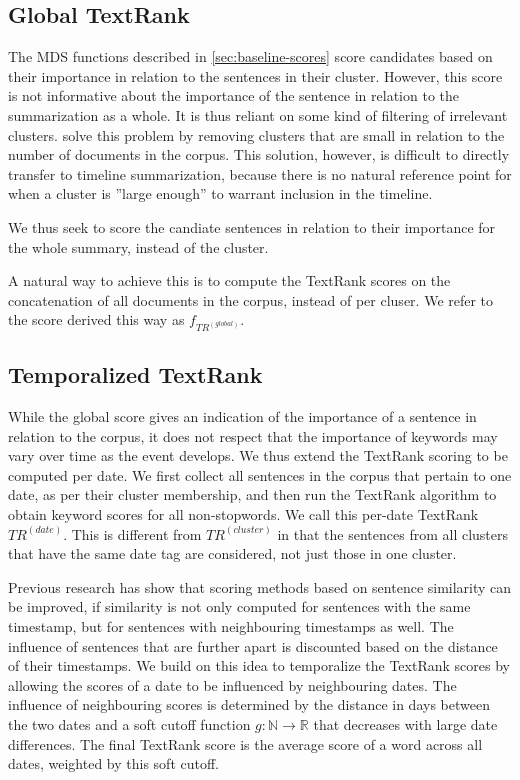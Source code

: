 \documentclass[a4paper,BCOR=10mm]{report}
\numberwithin{lemma}{chapter}
\numberwithin{definition}{chapter}
\begin{document}
\subsection{Global TextRank}

The MDS functions described in \ref{sec:baseline-scores} score candidates based on their importance in relation to the sentences in their cluster.
However, this score is not informative about the importance of the sentence in relation to the summarization as a whole.
It is thus reliant on some kind of filtering of irrelevant clusters. \citet{banerjee} solve this problem by removing clusters that are small in relation to the number of documents in the corpus. This solution, however, is difficult to directly transfer to timeline summarization, because there is no natural reference point for when a cluster is ''large enough'' to warrant inclusion in the timeline.

We thus seek to score the candiate sentences in relation to their importance for the whole summary, instead of the cluster.

A natural way to achieve this is to compute the TextRank \citep{textrank} scores on the concatenation of all documents in the corpus, instead of per cluser.
We refer to the score derived this way as $f_{TR^{(global)}}$.

\subsection{Temporalized TextRank}

While the global score gives an indication of the importance of a sentence in relation to the corpus, it does not respect that the importance of keywords may vary over time as the event develops.
We thus extend the TextRank scoring to be computed per date. We first collect all sentences in the corpus that pertain to one date, as per their cluster membership, and then run the TextRank algorithm to obtain keyword scores for all non-stopwords. We call this per-date TextRank $TR^{(date)}$.
This is different from $TR^{(cluster)}$ in that the sentences from all clusters that have the same date tag are considered, not just those in one cluster.

Previous research \citep{yan-trans, markert} has show that scoring methods based on sentence similarity can be improved, if similarity is not only computed for sentences with the same timestamp, but for sentences with neighbouring timestamps as well. The influence of sentences that are further apart is discounted based on the distance of their timestamps.
We build on this idea to temporalize the TextRank scores by allowing the scores of a date to be influenced by neighbouring dates. The influence of neighbouring scores is determined by the distance in days between the two dates and a soft cutoff function $g: \mathbb{N} \rightarrow \mathbb{R}$ that decreases with large date differences.
The final TextRank score is the average score of a word across all dates, weighted by this soft cutoff.
\end{document}
